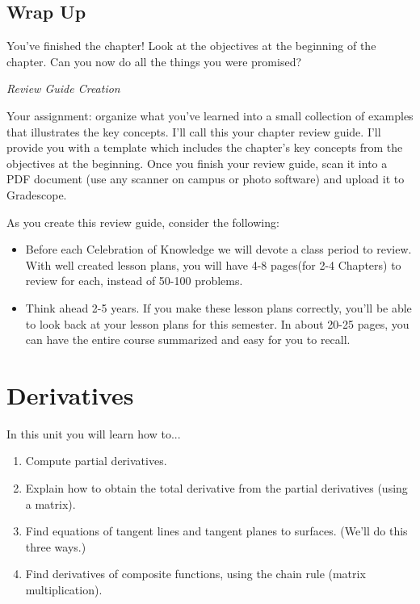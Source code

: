 \documentclass[10pt,]{book}
\theoremstyle{plain}
\theoremstyle{definition}
\theoremstyle{definition}
\theoremstyle{definition}
\theoremstyle{definition}
\theoremstyle{definition}
\numberwithin{equation}{section}
\begin{document}
\section*{Wrap Up}
You've finished the chapter! Look at the objectives at the beginning of the chapter. Can you now do all the things you were promised?%
\par
\emph{Review Guide Creation}%
\par
Your assignment: organize what you've learned into a small collection of examples that illustrates the key concepts. I'll call this your chapter review guide. I'll provide you with a template which includes the chapter's key concepts from the objectives at the beginning. Once you finish your review guide, scan it into a PDF document (use any scanner on campus or photo software) and upload it to Gradescope. %
\par
As you create this review guide, consider the following: \leavevmode%
\begin{itemize}[label=\textbullet]
\item{}Before each Celebration of Knowledge  we will devote a class period to review. With well created lesson plans, you will have 4-8 pages(for 2-4 Chapters) to review for each, instead of 50-100 problems.%
\item{}Think ahead 2-5 years. If you make these lesson plans correctly, you'll be able to look back at your lesson plans for this semester. In about 20-25 pages, you can have the entire course summarized and easy for you to recall.%
\end{itemize}
%
\typeout{************************************************}
\typeout{************************************************}
\chapter[{Derivatives}]{Derivatives}\label{chapter-7}
In this unit you will learn how to... \leavevmode%
\begin{enumerate}
\item\hypertarget{li-83}{}Compute partial derivatives.%
\item\hypertarget{li-84}{}Explain how to obtain the total derivative from the partial derivatives (using a matrix).%
\item\hypertarget{li-85}{}Find equations of tangent lines and tangent planes to surfaces. (We'll do this three ways.)%
\item\hypertarget{li-86}{}Find derivatives of composite functions, using the chain rule (matrix multiplication).%
\end{enumerate}
%
\typeout{************************************************}
\typeout{************************************************}
\end{document}
